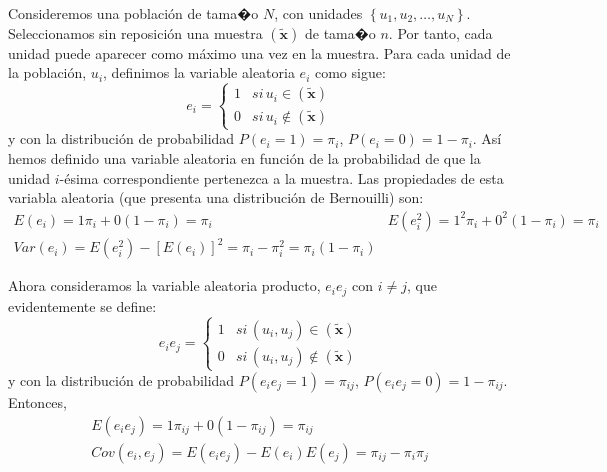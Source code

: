 Consideremos una poblaci\'on de tama�o $N$, con unidades $\left\{ u_{1},u_{2},\ldots,u_{N}\right\} $.
Seleccionamos sin reposici\'on una muestra $\left(\tilde{\boldsymbol{x}}\right)$
de tama�o $n$. Por tanto, cada unidad puede aparecer como m\'aximo
una vez en la muestra. Para cada unidad de la poblaci\'on, $u_{i}$,
definimos la variable aleatoria $e_{i}$ como sigue: 
\[
e_{i}=\begin{cases}
1 & si\,u_{i}\in\left(\tilde{\boldsymbol{x}}\right)\\
0 & si\,u_{i}\notin\left(\tilde{\boldsymbol{x}}\right)
\end{cases}
\]
 y con la distribuci\'on de probabilidad $P\left(e_{i}=1\right)=\pi_{i}$,
$P\left(e_{i}=0\right)=1-\pi_{i}$. As\'i hemos definido una variable
aleatoria en funci\'on de la probabilidad de que la unidad $i$-\'esima
correspondiente pertenezca a la muestra. Las propiedades de esta variabla
aleatoria (que presenta una distribuci\'on de Bernouilli) son: 
\[
\begin{array}{cc}
E\left(e_{i}\right)=1\pi_{i}+0\left(1-\pi_{i}\right)=\pi_{i} & E\left(e_{i}^{2}\right)=1^{2}\pi_{i}+0^{2}\left(1-\pi_{i}\right)=\pi_{i}\\
Var\left(e_{i}\right)=E\left(e_{i}^{2}\right)-\left[E\left(e_{i}\right)\right]^{2}=\pi_{i}-\pi_{i}^{2}=\pi_{i}\left(1-\pi_{i}\right)
\end{array}
\]


Ahora consideramos la variable aleatoria producto, $e_{i}e_{j}$ con
$i\neq j$, que evidentemente se define: 
\[
e_{i}e_{j}=\begin{cases}
1 & si\,\left(u_{i},u_{j}\right)\in\left(\tilde{\boldsymbol{x}}\right)\\
0 & si\,\left(u_{i},u_{j}\right)\notin\left(\tilde{\boldsymbol{x}}\right)
\end{cases}
\]
 y con la distribuci\'on de probabilidad $P\left(e_{i}e_{j}=1\right)=\pi_{ij}$,
$P\left(e_{i}e_{j}=0\right)=1-\pi_{ij}$. Entonces, 
\[
\begin{array}{c}
E\left(e_{i}e_{j}\right)=1\pi_{ij}+0\left(1-\pi_{ij}\right)=\pi_{ij}\\
Cov\left(e_{i},e_{j}\right)=E\left(e_{i}e_{j}\right)-E\left(e_{i}\right)E\left(e_{j}\right)=\pi_{ij}-\pi_{i}\pi_{j}
\end{array}
\]


